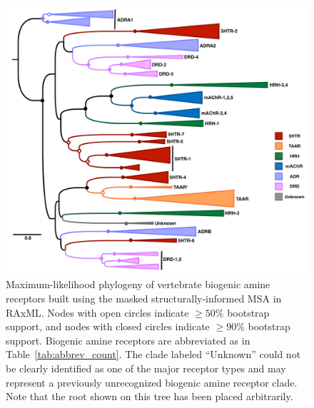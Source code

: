 \documentclass[fleqn,10pt]{wlpeerj}
\begin{document}
\newpage

\begin{figure}[htbp]
	\centerline{\includegraphics[width=18cm]{figures/vert_amine_tree.pdf}}
	\caption{\label{phylogeny} Maximum-likelihood phylogeny of vertebrate biogenic amine receptors built using the masked structurally-informed MSA in RAxML. Nodes with open circles indicate $\geq 50\%$ bootstrap support, and nodes with closed circles indicate $\geq 90\%$ bootstrap support. Biogenic amine receptors are abbreviated as in Table~\ref{tab:abbrev_count}. The clade labeled ``Unknown'' could not be clearly identified as one of the major receptor types and may represent a previously unrecognized biogenic amine receptor clade. Note that the root shown on this tree has been placed arbitrarily.}
\end{figure}


\newpage
\end{document}
